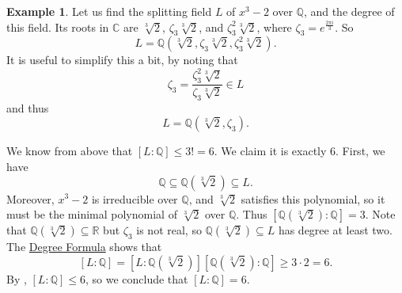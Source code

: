 \documentclass[12pt]{report}
\numberwithin{equation}{section}
\numberwithin{theorem}{chapter}
\theoremstyle{definition}
\newtheorem{example}[theorem]{Example}
\newtheorem*{basic properties}{Basic Properties}
\newtheorem*{Important Remark}{Important Remark}
\newcommand{\R}{\mathbb{R}}
\newcommand{\Q}{\mathbb{Q}}
\newcommand{\C}{\mathbb{C}}
\begin{document}
\begin{example}\label{example splitting field x3-2}
Let us find the splitting field $L$ of $x^3 -2$ over $\Q$, and the degree of this field.
Its roots in $\C$ are $\sqrt[3]{2}$, $\zeta_3 \sqrt[3]{2}$, and $\zeta_3^2 \sqrt[3]{2}$, where $\zeta_3 = e^{\frac{2 \pi i}{3}}$.
So
$$L = \Q(\sqrt[3]{2}, \zeta_3 \sqrt[3]{2}, \zeta_3^2 \sqrt[3]{2}).$$
It is useful to simplify this a bit, by noting that 
$$\zeta_3 = \frac{\zeta_3^2 \sqrt[3]{2}}{\zeta_3 \sqrt[3]{2}} \in L$$
and thus
$$L = \Q(\sqrt[3]{2}, \zeta_3).$$

We know from  above that $[L: \Q] \leqslant 3! = 6$. We claim it is exactly $6$. First, we have
$$\Q \subseteq \Q(\sqrt[3]{2}) \subseteq L.$$
Moreover, $x^3 - 2$ is irreducible over $\Q$, and $\sqrt[3]{2}$ satisfies this polynomial, so it must be the minimal polynomial of $\sqrt[3]{2}$ over $\Q$. Thus $[\Q(\sqrt[3]{2}): \Q] = 3$.
Note that $\Q(\sqrt[3]{2}) \subseteq \R$ but $\zeta_3$ is not real, so $\Q(\sqrt[3]{2}) \subseteq L$ has degree at least two. The \hyperref[deg formula]{Degree Formula} shows that 
$$[L:\Q] =  [L : \Q(\sqrt[3]{2})] [\Q(\sqrt[3]{2}): \Q] \geqslant 3 \cdot 2= 6.$$
By , $[L:\Q] \leqslant 6$, so we conclude that $[L:\Q] = 6$.

\end{example}
\end{document}

